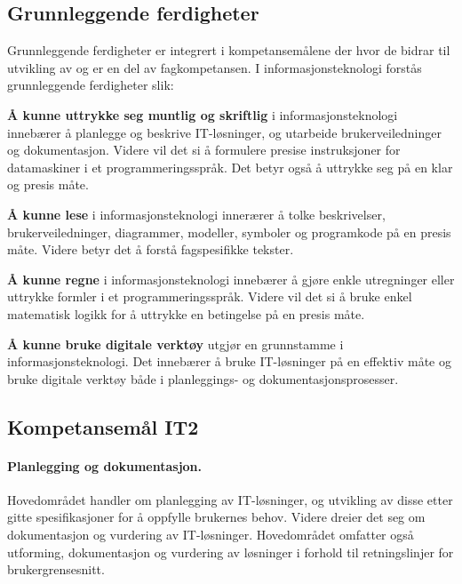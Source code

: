 \documentclass[%
oneside,                 %
final,                   %
12pt]{article}
\newenvironment{block_mdfboxadmon}[1][]{
\begin{block_mdfboxmdframed}[frametitle=#1]
}
{
\end{block_mdfboxmdframed}
}
\begin{document}
\subsection{Grunnleggende ferdigheter}

Grunnleggende ferdigheter er integrert i kompetansemålene der hvor de
bidrar til utvikling av og er en del av fagkompetansen. I
informasjonsteknologi forstås grunnleggende ferdigheter slik:


\begin{block_mdfboxadmon}[]

\textbf{Å kunne uttrykke seg muntlig og skriftlig} i informasjonsteknologi
innebærer å planlegge og beskrive IT-løsninger, og utarbeide
brukerveiledninger og dokumentasjon. Videre vil det si å formulere
presise instruksjoner for datamaskiner i et programmeringsspråk. Det
betyr også å uttrykke seg på en klar og presis måte.

\textbf{Å kunne lese} i informasjonsteknologi innerærer å tolke beskrivelser,
brukerveiledninger, diagrammer, modeller, symboler og programkode på
en presis måte. Videre betyr det å forstå fagspesifikke tekster.

\textbf{Å kunne regne} i informasjonsteknologi innebærer å gjøre enkle
utregninger eller uttrykke formler i et programmeringsspråk. Videre
vil det si å bruke enkel matematisk logikk for å uttrykke en
betingelse på en presis måte.

\textbf{Å kunne bruke digitale verktøy} utgjør en grunnstamme i
informasjonsteknologi. Det innebærer å bruke IT-løsninger på en
effektiv måte og bruke digitale verktøy både i planleggings- og
dokumentasjonsprosesser.
\end{block_mdfboxadmon}



\subsection{Kompetansemål IT2}
\label{section:kompetansemål}

\paragraph{Planlegging og dokumentasjon.}
Hovedområdet handler om planlegging av IT-løsninger, og utvikling av
disse etter gitte spesifikasjoner for å oppfylle brukernes
behov. Videre dreier det seg om dokumentasjon og vurdering av
IT-løsninger. Hovedområdet omfatter også utforming, dokumentasjon og
vurdering av løsninger i forhold til retningslinjer for
brukergrensesnitt.
\end{document}
